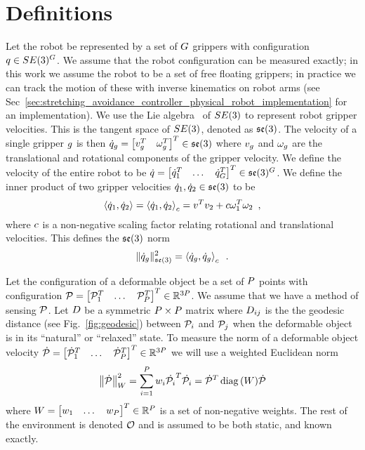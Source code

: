 
\section{Definitions}

Let the robot be represented by a set of $G$ grippers with configuration $q \in SE(3)^G$.  We assume that the robot configuration can be measured exactly; in this work we assume the robot to be a set of free floating grippers; in practice we can track the motion of these with inverse kinematics on robot arms (see Sec~\ref{sec:stretching_avoidance_controller_physical_robot_implementation} for an implementation). We use the Lie algebra~\cite{Murray1994} of $SE(3)$ to represent robot gripper velocities. This is the tangent space of $SE(3)$, denoted as $\mathfrak{se}(3)$. The velocity of a single gripper $g$ is then $\dot{q}_g = \begin{bmatrix}v_g^T & \omega_g^T\end{bmatrix}^T \in \mathfrak{se}(3)$ where $v_g$ and $\omega_g$ are the translational and rotational components of the gripper velocity. We define the velocity of the entire robot to be $\dot{q} = \begin{bmatrix}\dot{q}_1^T & \dots & \dot{q}_G^T \end{bmatrix}^T \in \mathfrak{se}(3)^G$. We define the inner product of two gripper velocities $\dot{q}_1, \dot{q}_2 \in \mathfrak{se}(3)$ to be 
\begin{equation}
    \left \langle \dot{q}_1, \dot{q}_2 \right \rangle = \left \langle \dot{q}_1, \dot{q}_2 \right \rangle_c = v^T v_2 + c \omega_1^T \omega_2 \enspace,
\end{equation}
where $c$ is a non-negative scaling factor relating rotational and translational velocities. This defines the $\mathfrak{se}(3)$ norm
\begin{equation}
    \| \dot{q}_g \|_{\mathfrak{se}(3)}^2 = \left \langle \dot{q}_g, \dot{q}_g \right \rangle_c \enspace .
\end{equation}

Let the configuration of a deformable object be a set of $P$ points with configuration $\mathcal{P} = \begin{bmatrix} \mathcal{P}_1^T & \dots & \mathcal{P}_P^T \end{bmatrix}^T \in \mathbb{R}^{3P}$. We assume that we have a method of sensing $\mathcal{P}$. Let $D$ be a symmetric $P \times P$ matrix where $D_{i j}$ is the the geodesic distance (see Fig.~\ref{fig:geodesic}) between $\mathcal{P}_i$ and $\mathcal{P}_j$ when the deformable object is in its ``natural'' or ``relaxed'' state. To measure the norm of a deformable object velocity $\dot{\mathcal{P}} = \begin{bmatrix} \dot{\mathcal{P}}_1^T & \dots & \dot{\mathcal{P}}_P^T \end{bmatrix}^T \in \mathbb{R}^{3P} $ we will use a weighted Euclidean norm
\begin{equation}
    \left\| \dot{\mathcal{P}} \right\|^2_W = \sum_{i = 1}^P w_i \dot{\mathcal{P}_i}^T \dot{\mathcal{P}_i} = \dot{\mathcal{P}}^T \operatorname*{diag}{(W)} \dot{\mathcal{P}}
\end{equation}
where $W = \begin{bmatrix}w_1 & \dots & w_P \end{bmatrix}^T \in \mathbb{R}^P$ is a set of non-negative weights. The rest of the environment is denoted $\mathcal{O}$ and is assumed to be both static, and known exactly.

